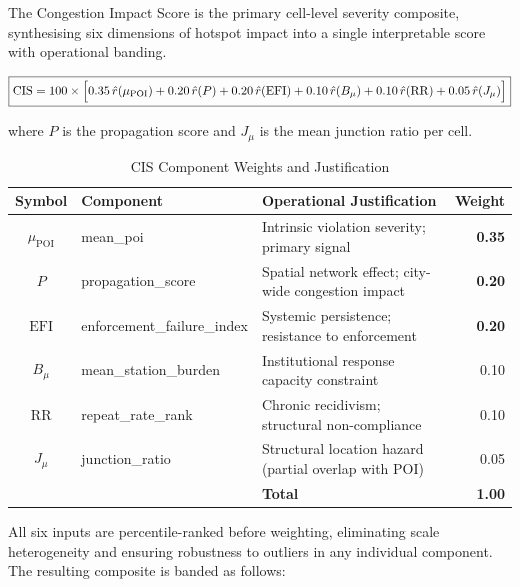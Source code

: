 \documentclass[12pt,a4paper]{article}
\begin{document}
The Congestion Impact Score is the primary cell-level severity composite, synthesising six
dimensions of hotspot impact into a single interpretable score with operational banding.

\begin{equation}
\boxed{
\mathrm{CIS} = 100 \times \Bigl[
  0.35\,\hat{r}(\mu_{\mathrm{POI}})
  + 0.20\,\hat{r}(P)
  + 0.20\,\hat{r}(\mathrm{EFI})
  + 0.10\,\hat{r}(B_\mu)
  + 0.10\,\hat{r}(\mathrm{RR})
  + 0.05\,\hat{r}(J_\mu)
\Bigr]
}
\label{eq:cis}
\end{equation}

where $P$ is the propagation score and $J_\mu$ is the mean junction ratio per cell.

\begin{table}[htbp]
\centering
\caption{CIS Component Weights and Justification}
\label{tab:cis}
\begin{tabularx}{\textwidth}{@{}clXr@{}}
\toprule
\textbf{Symbol} & \textbf{Component} & \textbf{Operational Justification} & \textbf{Weight}\\
\midrule
$\mu_{\mathrm{POI}}$ & mean\_poi                & Intrinsic violation severity; primary signal       & \textbf{0.35}\\
$P$                   & propagation\_score       & Spatial network effect; city-wide congestion impact & \textbf{0.20}\\
$\mathrm{EFI}$        & enforcement\_failure\_index & Systemic persistence; resistance to enforcement  & \textbf{0.20}\\
$B_\mu$               & mean\_station\_burden    & Institutional response capacity constraint         & 0.10\\
$\mathrm{RR}$         & repeat\_rate\_rank       & Chronic recidivism; structural non-compliance      & 0.10\\
$J_\mu$               & junction\_ratio          & Structural location hazard (partial overlap with POI) & 0.05\\
\midrule
& & \textbf{Total} & \textbf{1.00}\\
\bottomrule
\end{tabularx}
\end{table}

All six inputs are percentile-ranked before weighting, eliminating scale heterogeneity and
ensuring robustness to outliers in any individual component. The resulting composite is
banded as follows:
\end{document}
